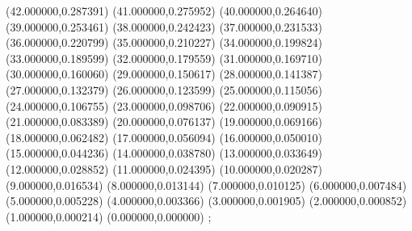 {(42.000000,0.287391)
(41.000000,0.275952)
(40.000000,0.264640)
(39.000000,0.253461)
(38.000000,0.242423)
(37.000000,0.231533)
(36.000000,0.220799)
(35.000000,0.210227)
(34.000000,0.199824)
(33.000000,0.189599)
(32.000000,0.179559)
(31.000000,0.169710)
(30.000000,0.160060)
(29.000000,0.150617)
(28.000000,0.141387)
(27.000000,0.132379)
(26.000000,0.123599)
(25.000000,0.115056)
(24.000000,0.106755)
(23.000000,0.098706)
(22.000000,0.090915)
(21.000000,0.083389)
(20.000000,0.076137)
(19.000000,0.069166)
(18.000000,0.062482)
(17.000000,0.056094)
(16.000000,0.050010)
(15.000000,0.044236)
(14.000000,0.038780)
(13.000000,0.033649)
(12.000000,0.028852)
(11.000000,0.024395)
(10.000000,0.020287)
(9.000000,0.016534)
(8.000000,0.013144)
(7.000000,0.010125)
(6.000000,0.007484)
(5.000000,0.005228)
(4.000000,0.003366)
(3.000000,0.001905)
(2.000000,0.000852)
(1.000000,0.000214)
(0.000000,0.000000)
};
